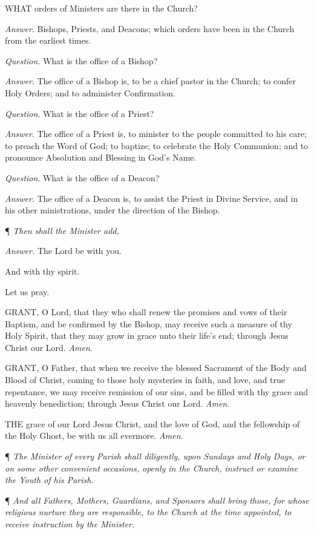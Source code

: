 WHAT
orders of Ministers are there in the Church?

\emph{Answer}. Bishops, Priests, and Deacons; which
orders have been in the Church from the earliest times.

\emph{Question}. What is the office of a Bishop?

\emph{Answer}. The office of a Bishop is, to be
a chief pastor in the Church; to confer Holy Orders; and to administer
Confirmation.

\emph{Question}. What is the office of a Priest?

\emph{Answer}. The office of a Priest is, to minister
to the people committed to his care; to preach the Word of God; to baptize;
to celebrate the Holy Communion; and to pronounce Absolution and Blessing
in God's Name.

\emph{Question}. What is the office of a Deacon?

\emph{Answer}. The office of a Deacon is, to assist
the Priest in Divine Service, and in his other ministrations, under
the direction of the Bishop.

¶ \emph{Then shall the Minister add,}

\emph{Answer.} The Lord be with
you. 

And with thy spirit.

Let us pray.

GRANT, O Lord, that they
who shall renew the promises and vows of their Baptism, and be confirmed
by the Bishop, may receive such a measure of thy Holy Spirit, that they
may grow in grace unto their life's end; through Jesus Christ our Lord.
\emph{Amen}.

GRANT, O Father, that when
we receive the blessed Sacrament of the Body and Blood of Christ, coming
to those holy mysteries in faith, and love, and true repentance, we may
receive remission of our sins, and befilled with thy grace and heavenly
benediction; through Jesus Christ our Lord. \emph{Amen}. 

THE grace of our Lord Jesus Christ, and
the love of God, and the fellowship of the Holy Ghost, be with us all
evermore. \emph{Amen.}

¶ \emph{The Minister
of every Parish shall diligently, upon Sundays and Holy Days, or on some
other convenient occasions, openly in the Church, instruct or examine
the Youth of his Parish.}

¶ \emph{And all Fathers,
Mothers, Guardians, and Sponsors shall bring those, for whose religious
nurture they are responsible, to the Church at the time appointed, to
receive instruction by the Minister.}

